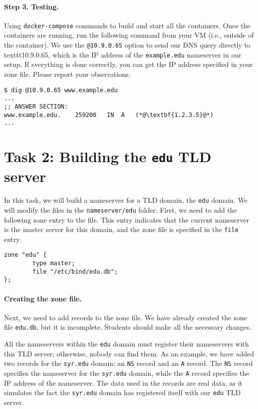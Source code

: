 \paragraph{Step 3. Testing.} Using \texttt{docker-compose} commands
to build and start all the containers. 
Once the containers are running,
run the following command from your VM (i.e., outside of the 
container). We use the \texttt{@10.9.0.65} option to send our DNS query
directly to texttt{10.9.0.65}, which is the IP
address of the \texttt{example.edu} nameserver in our setup. 
If everything is done correctly, you can get the IP address specified
in your zone file. Please report your observations.

\begin{lstlisting}
$ dig @10.9.0.65 www.example.edu
... 
;; ANSWER SECTION:
www.example.edu.    259200   IN  A   (*@\textbf{1.2.3.5}@*)
...
\end{lstlisting}





\section{Task 2: Building the \texttt{edu} TLD server}


In this task, we will build a nameserver for a TLD domain, 
the \texttt{edu} domain.
We will modify the files in the \texttt{nameserver/edu} folder. 
First, we need to  add the following zone entry to the
 file. This entry indicates that the current nameserver
is the master server for this domain, and the zone file is
specified in the \texttt{file} entry.

\begin{lstlisting}
zone "edu" {
        type master;
        file "/etc/bind/edu.db";
};
\end{lstlisting}


\paragraph{Creating the zone file.} Next, we need to
add records to the zone file. 
We have already created the zone file \texttt{edu.db},
but it is incomplete. Students should make all the 
necessary changes. 

All the nameservers within the \texttt{edu} domain
must register their nameservers with this 
TLD server; otherwise, nobody can find them. As an example,
we have added two records for the \texttt{syr.edu} domain: 
an \texttt{NS} record and an \texttt{A} record.
The \texttt{NS} record specifies the nameserver for the 
\texttt{syr.edu} domain, while the \texttt{A} record
specifies the IP address of the nameserver. The
data used in the records are real data, as it simulates
the fact the \texttt{syr.edu} domain has registered 
itself with our \texttt{edu} TLD server.

